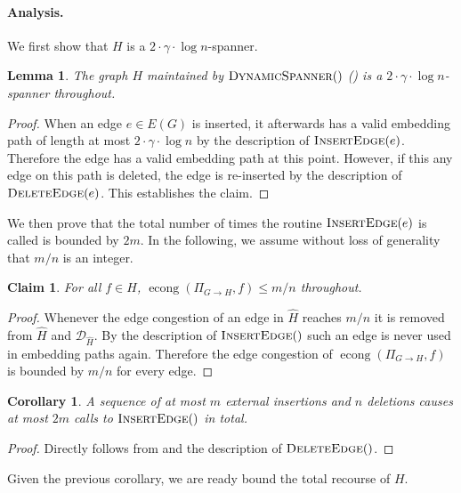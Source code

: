 \documentclass[11pt]{article}
\newtheorem{corollary}[theorem]{Corollary}
\newtheorem{lemma}[theorem]{Lemma}
\newtheorem{claim}[theorem]{Claim}
\renewcommand{\hat}{\widehat}
\DeclareMathOperator{\econg}{econg}
\begin{document}
\paragraph{Analysis. } 

We first show that $H$ is a $2 \cdot \gamma \cdot \log n$-spanner. 

\begin{lemma}
    The graph $H$ maintained by $\textsc{DynamicSpanner}()$ () is a $2 \cdot \gamma \cdot \log n$-spanner throughout. 
\end{lemma}
\begin{proof}
    When an edge $e \in E(G)$ is inserted, it afterwards has a valid embedding path of length at most $2 \cdot \gamma \cdot  \log n$ by the description of $\textsc{InsertEdge}(e)$. Therefore the edge has a valid embedding path at this point. However, if this any edge on this path is deleted, the edge is re-inserted by the description of $\textsc{DeleteEdge}(e)$. This establishes the claim.
\end{proof}

We then prove that the total number of times the routine $\textsc{InsertEdge}(e)$ is called is bounded by $2m$. In the following, we assume without loss of generality that $m/n$ is an integer. 

\begin{claim} \label{clm:econg}
    For all $f \in H$, $\econg(\Pi_{G \rightarrow H}, f) \leq m/n$ throughout.
\end{claim}
\begin{proof}
    Whenever the edge congestion of an edge in $\hat{H}$ reaches $m/n$ it is removed from $\hat{H}$ and $\mathcal{D}_{\hat{H}}$. By the description of $\textsc{InsertEdge}()$ such an edge is never used in embedding paths again. Therefore the edge congestion of $\econg(\Pi_{G \rightarrow H}, f)$ is bounded by $m/n$ for every edge. 
\end{proof}

\begin{corollary}\label{corr:all_insertions}
    A sequence of at most $m$ external insertions and $n$ deletions causes at most $2m$ calls to $\textsc{InsertEdge}()$ in total.
\end{corollary}
\begin{proof}
    Directly follows from  and the description of $\textsc{DeleteEdge}()$.
\end{proof}

Given the previous corollary, we are ready bound the total recourse of $H$. 
\end{document}
